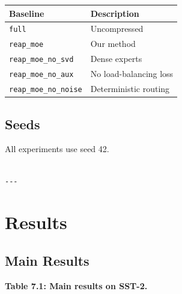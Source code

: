\begin{table}[H]
\centering
\small
\begin{tabular}{ll}
\toprule
\textbf{Baseline} & \textbf{Description} \\
\midrule
\texttt{full} & Uncompressed \\
\texttt{reap\_moe} & Our method \\
\texttt{reap\_moe\_no\_svd} & Dense experts \\
\texttt{reap\_moe\_no\_aux} & No load-balancing loss \\
\texttt{reap\_moe\_no\_noise} & Deterministic routing \\
\bottomrule
\end{tabular}
\end{table}

\subsection{Seeds}

All experiments use seed 42.
\begin{lstlisting}

---
\end{lstlisting}

\section{Results}

\subsection{Main Results}

\textbf{Table 7.1: Main results on SST-2.}

